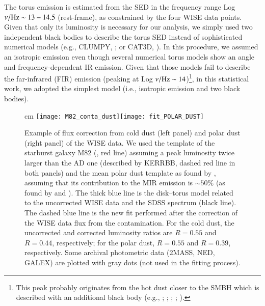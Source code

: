 \documentclass[]{aa}
\begin{document}
The torus emission is estimated from the SED in the frequency range Log $\nu / {\rm Hz} \sim 13 - 14.5$ (rest-frame), as constrained by the four WISE data points. Given that only its luminosity is necessary for our analysis, we simply used two independent black bodies to describe the torus SED instead of sophisticated numerical models (e.g., CLUMPY, \citealt{Nenka, Nenkb}; or CAT3D, \citealt{HonKish}). In this procedure, we assumed an isotropic emission even though several numerical torus models show an angle and frequency-dependent IR emission. Given that those models fail to describe the far-infrared (FIR) emission (peaking at Log $\nu / {\rm Hz} \sim 14$)\footnote{This peak probably originates from the hot dust closer to the SMBH which is described with an additional black body (e.g., \citealt{Deoetal}; \citealt{MorNet}; \citealt{Leip}; \citealt{Krog}; \citealt{Zhuang}).}, in this statistical work, we adopted the simplest model (i.e., isotropic emission and two black bodies).

\begin{figure*}
\centering
{} cm
\texttt{[image: M82\_conta\_dust]}\texttt{[image: fit\_POLAR\_DUST]} 
\caption{Example of flux correction from cold dust (left panel) and polar dust (right panel) of the WISE data. We used the template of the starburst galaxy M82 (\citealt{Kennetal}, red line) assuming a peak luminosity twice larger than the AD one (described by KERRBB, dashed red line in both panels) and the mean polar dust template as found by \citet{Lyu}, assuming that its contribution to the MIR emission is $\sim 50 \%$ (as found by \citealt{Asmus16} and \citealt{Lyu}). The thick blue line is the disk--torus model related to the uncorrected WISE data and the SDSS spectrum (black line). The dashed blue line is the new fit performed after the correction of the WISE data flux from the contamination. For the cold dust, the uncorrected and corrected luminosity ratios are $R = 0.55$ and $R = 0.44$, respectively; for the polar dust, $R = 0.55$ and $R = 0.39$, respectively. Some archival photometric data (2MASS, NED, GALEX) are plotted with gray dots (not used in the fitting process).}
\label{colddust}
\end{figure*}
\end{document}
